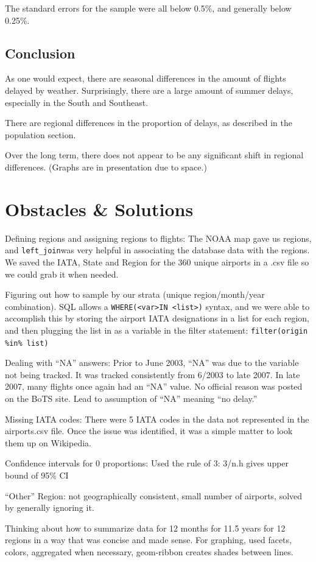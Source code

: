 \documentclass{article}
\begin{document}
\begin{multicols}{2}
The standard errors for the sample were all below 0.5\%, and generally below 0.25\%.

\subsection{Conclusion}
As one would expect, there are seasonal differences in the amount of flights delayed by weather. Surprisingly, there are a large amount of summer delays, especially in the South and Southeast. 

There are regional differences in the proportion of delays, as described in the population section.

Over the long term, there does not appear to be any significant shift in regional differences. (Graphs are in presentation due to space.)

\section{Obstacles \& Solutions}
Defining regions and assigning regions to flights: The NOAA map gave us regions, and \texttt{left\_join}was very helpful in associating the database data with the regions. We saved the IATA, State and Region for the 360 unique airports in a .csv file so we could grab it when needed.

Figuring out how to sample by our strata (unique region/month/year combination). SQL allows a \texttt{WHERE(\textless var\textgreater  IN \textless list\textgreater)} syntax, and we were able to accomplish this by storing the airport IATA designations in a list for each region, and then plugging the list in as a variable in the filter statement: \texttt{filter(origin \%in\% list)}

Dealing with ``NA'' answers: Prior to June 2003, ``NA'' was due to the variable not being tracked. It was tracked consistently from 6/2003 to late 2007. In late 2007, many flights once again had an ``NA'' value. No official reason was posted on the BoTS site. Lead to assumption of ``NA'' meaning ``no delay.''

Missing IATA codes: There were 5 IATA codes in the data not represented in the airports.csv file. Once the issue was identified, it was a simple matter to look them up on Wikipedia. 

Confidence intervals for 0 proportions: Used the rule of 3: 3/n.h gives upper bound of 95\% CI

``Other'' Region: not geographically consistent, small number of airports, solved by generally ignoring it.

Thinking about how to summarize data for 12 months for 11.5 years for 12 regions in a way that was concise and made sense. For graphing, used facets, colors, aggregated when necessary, geom-ribbon creates shades between lines.
\end{multicols}
\end{document}
